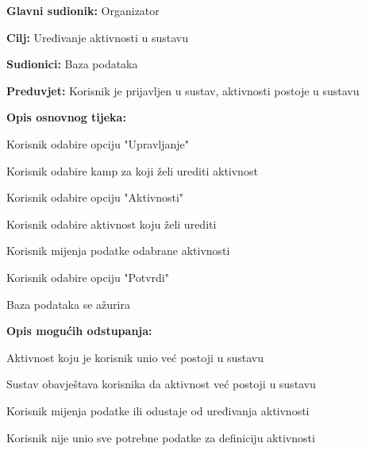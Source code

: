 					\noindent {}
					\begin{packed_item}
						
						\item \textbf{Glavni sudionik: }Organizator
						\item  \textbf{Cilj:} Uređivanje aktivnosti u sustavu
						\item  \textbf{Sudionici:} Baza podataka
						\item  \textbf{Preduvjet:} Korisnik je prijavljen u sustav, aktivnosti postoje u sustavu
						\item  \textbf{Opis osnovnog tijeka:}
						
						\item[] \begin{packed_enum}
							
							
							\item Korisnik odabire opciju "Upravljanje"
							\item Korisnik odabire kamp za koji želi urediti aktivnost
							\item Korisnik odabire opciju "Aktivnosti"
							\item Korisnik odabire aktivnost koju želi urediti
							\item Korisnik mijenja podatke odabrane aktivnosti
							\item Korisnik odabire opciju "Potvrdi"
							\item Baza podataka se ažurira
						\end{packed_enum}
						
						\item  \textbf{Opis mogućih odstupanja:}
						
						\item[] \begin{packed_item}
							
							\item[6.a] Aktivnost koju je korisnik unio već postoji u sustavu
							\item[] \begin{packed_enum}
								
								\item Sustav obavještava korisnika da aktivnost već postoji u sustavu
								\item Korisnik mijenja podatke ili odustaje od uređivanja aktivnosti 
								
							\end{packed_enum}
							\item[6.b] Korisnik nije unio sve potrebne podatke za definiciju aktivnosti
							\item[] \begin{packed_enum}
								

\end{packed_enum}
\end{packed_item}
\end{packed_item}
